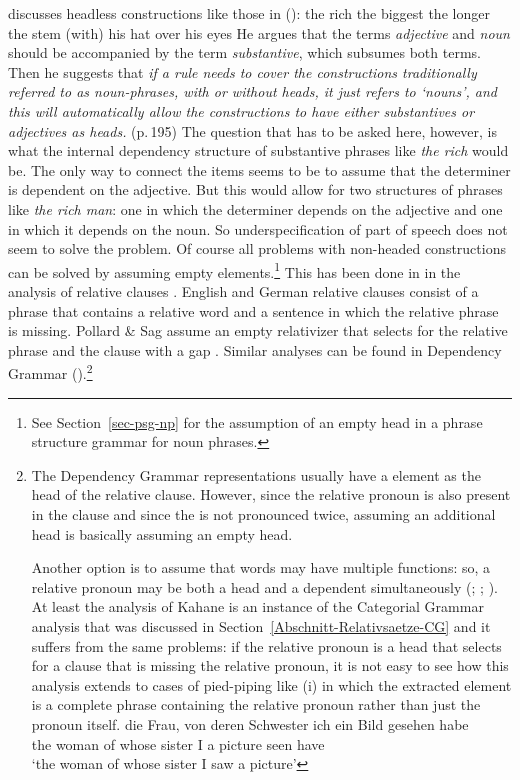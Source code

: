 \citet[Section~4.E]{Hudson80a} discusses headless constructions like those in ():
\eal
\ex the rich
\ex the biggest
\ex the longer the stem
\ex (with) his hat over his eyes
\zl
He argues that the terms \emph{adjective} and \emph{noun} should be accompanied by the term
\emph{substantive}, which subsumes both terms. Then he suggests that \emph{if a rule needs to cover
  the constructions traditionally referred to as noun-phrases, with or without heads, it just
  refers to `nouns', and this will automatically allow the constructions to have either
substantives or adjectives as heads.} (p.\,195) The question that has to be asked here, however, is
what the internal dependency structure of substantive phrases like \emph{the rich} would be. The
only way to connect the items seems to be to assume that the determiner is dependent on the
adjective. But this would allow for two structures of phrases like \emph{the rich man}: one in which
the determiner depends on the adjective and one in which it depends on the noun. So
underspecification of part of speech does not seem to solve the problem. Of course all problems with
non-headed constructions can be solved by assuming empty elements.\footnote{%
 See Section~\ref{sec-psg-np} for the assumption of an empty head in a phrase structure grammar for
 noun phrases.}
This has been done in \hpsg in the analysis of relative clauses \citep[Chapter~5]{ps2}. English and German relative clauses consist of a
phrase that contains a relative word and a sentence in which the relative phrase is missing. Pollard
\& Sag assume an empty relativizer that selects for the relative phrase and the clause with a
gap \citep[--217]{ps2}. Similar analyses can be found in Dependency Grammar (\citealp[]{Eroms2000a}).\footnote{%
  The Dependency Grammar representations usually have a  element as the head of the relative
  clause. However, since the relative pronoun is also present in the clause and since the 
  is not pronounced twice, assuming an additional  head is basically assuming an empty
  head. 

  Another option is to assume that words may have multiple functions: so, a relative pronoun may be
  both a head and a dependent simultaneously (\citealp[Chapter 246, §8--11]{Tesniere2015a-not-crossreferenced}; \citealp[\page xlvi]{OK2015a}; \citealp[--130]{Kahane2009a}). At least the analysis of Kahane is an instance of the Categorial
  Grammar analysis that was discussed in Section~\ref{Abschnitt-Relativsaetze-CG} and it suffers from the same problems: if the
  relative pronoun is a head that selects for a clause that is missing the relative pronoun, it is not easy to see how
  this analysis extends to cases of pied-piping like (i) in which the extracted element is a complete phrase
  containing the relative pronoun rather than just the pronoun itself.
\ea
\gll die Frau, von deren Schwester ich ein Bild gesehen habe\\
     the woman of whose sister I a picture seen have\\
\glt `the woman of whose sister I saw a picture'
\zlast
}
